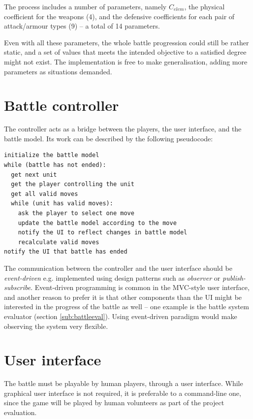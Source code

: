 The process includes a number of parameters, namely $C_{elem}$, the physical coefficient for the weapons (4), and the defensive coefficients for each pair of attack/armour types (9) -- a total of 14 parameters. 

\bigskip

Even with all these parameters, the whole battle progression could still be rather static, and a set of values that meets the intended objective to a satisfied degree might not exist. The implementation is free to make generalisation, adding more parameters as situations demanded.

\section{Battle controller}
\label{sub:battlecontroller}

The controller acts as a bridge between the players, the user interface, and the battle model. Its work can be described by the following pseudocode:

\begin{lstlisting}
initialize the battle model
while (battle has not ended):
  get next unit
  get the player controlling the unit
  get all valid moves
  while (unit has valid moves):
    ask the player to select one move
    update the battle model according to the move
    notify the UI to reflect changes in battle model
    recalculate valid moves
notify the UI that battle has ended
\end{lstlisting}

The communication between the controller and the user interface should be \textit{event-driven} e.g. implemented using design patterns such as \textit{observer} or \textit{publish-subscribe}. Event-driven programming is common in the MVC-style user interface, and another reason to prefer it is that other components than the UI might be interested in the progress of the battle as well -- one example is the battle system evaluator (section \ref{sub:battleeval}). Using event-driven paradigm would make observing the system very flexible.

\section{User interface}

The battle must be playable by human players, through a user interface. While graphical user interface is not required, it is preferable to a command-line one, since the game will be played by human volunteers as part of the project evaluation.

